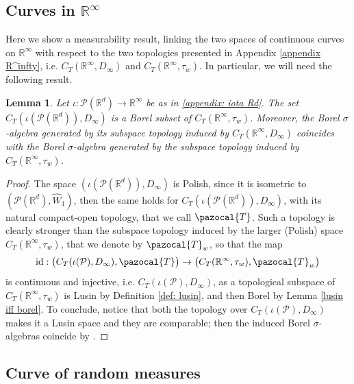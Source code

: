 \documentclass[10pt,leqno]{amsart}
\numberwithin{equation}{section}
\newtheorem{lemma}[teorema]{Lemma}
\newcommand{\R}{\mathbb{R}}
\newcommand{\PP}{\mathcal{P}}
\begin{document}
\subsection{Curves in \texorpdfstring{$\R^\infty$}{}}
Here we show a measurability result, linking the two spaces of continuous curves on $\R^\infty$ with respect to the two topologies presented in Appendix \ref{appendix R^infty}, i.e. $C_T(\R^\infty, D_\infty)$ and $C_T(\R^\infty, \tau_w)$. In particular, we will need the following result.

\begin{lemma}\label{lemma: meas of curves in R^infty}
    Let $\iota:\PP(\R^d)\to\R^\infty$ be as in \eqref{appendix: iota Rd}. The set $C_T(\iota(\PP(\R^d)),D_\infty)$ is a Borel subset of $C_T(\R^\infty,\tau_w)$. Moreover, the Borel $\sigma$-algebra generated by its subspace topology induced by $C_T(\R^\infty,D_\infty)$ coincides with the Borel $\sigma$-algebra generated by the subspace topology induced by $C_T(\R^\infty, \tau_w)$.
\end{lemma}

\begin{proof}
    The space $(\iota(\PP(\R^d)),D_\infty)$ is Polish, since it is isometric to $(\PP(\R^d),\hat{W}_1)$, then the same holds for $C_T(\iota(\PP(\R^d)),D_\infty)$, with its natural compact-open topology, that we call $\pazocal{T}$. Such a topology is clearly stronger than the subspace topology induced by the larger (Polish) space $C_T(\R^\infty, \tau_w)$, that we denote by $\pazocal{T}_w$, so that the map
    \[\operatorname{id}:\big(C_T(\iota(\PP),D_\infty), \pazocal{T}\big) \to \big(C_T(\R^\infty,\tau_w),\pazocal{T}_w\big)\]
    is continuous and injective, i.e. $C_T(\iota(\PP),D_\infty)$, as a topological subspace of $C_T(\R^\infty,\tau_w)$ is Lusin by Definition \ref{def: lusin}, and then Borel by Lemma \ref{lusin iff borel}. 
    To conclude, notice that both the topology over $C_T(\iota(\PP),D_\infty)$ makes it a Lusin space and they are comparable; then the induced Borel $\sigma$-algebras coincide by \cite[Corollary 2, pp. 101]{schwariz1973radon}.
\end{proof}


\subsection{Curve of random measures}
\end{document}
